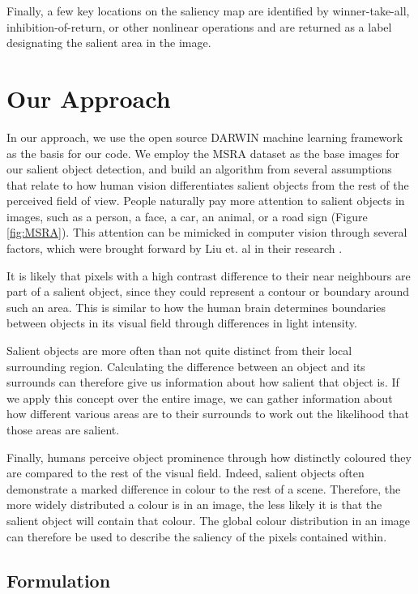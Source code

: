 \documentclass[10pt,twocolumn,letterpaper]{article}
\begin{document}
Finally, a few key locations on the saliency map are identified by winner-take-all, inhibition-of-return, or other nonlinear operations and are returned as a label designating the salient area in the image.

\section{Our Approach}
In our approach, we use the open source DARWIN machine learning framework \cite{drwn} as the basis for our code. We employ the MSRA dataset as the base images for our salient object detection, and build an algorithm from several assumptions that relate to how human vision differentiates salient objects from the rest of the perceived field of view.  People naturally pay more attention to salient objects in images, such as a person, a face, a car, an animal, or a road sign (Figure \ref{fig:MSRA}). This attention can be mimicked in computer vision through several factors, which were brought forward by Liu et. al in their research \cite{sal2007}\cite{sal2011}.

It is likely that pixels with a high contrast difference to their near neighbours are part of a salient object, since they could represent a contour or boundary around such an area.  This is similar to how the human brain determines boundaries between objects in its visual field through differences in light intensity.

Salient objects are more often than not quite distinct from their local surrounding region.  Calculating the difference between an object and its surrounds can therefore give us information about how salient that object is.  If we apply this concept over the entire image, we can gather information about how different various areas are to their surrounds to work out the likelihood that those areas are salient.

Finally, humans perceive object prominence through how distinctly coloured they are compared to the rest of the visual field.  Indeed, salient objects often demonstrate a marked difference in colour to the rest of a scene.  Therefore, the more widely distributed a colour is in an image, the less likely it is that the salient object will contain that colour.  The global colour distribution in an image can therefore be used to describe the saliency of the pixels contained within.

\subsection{Formulation}
\end{document}
